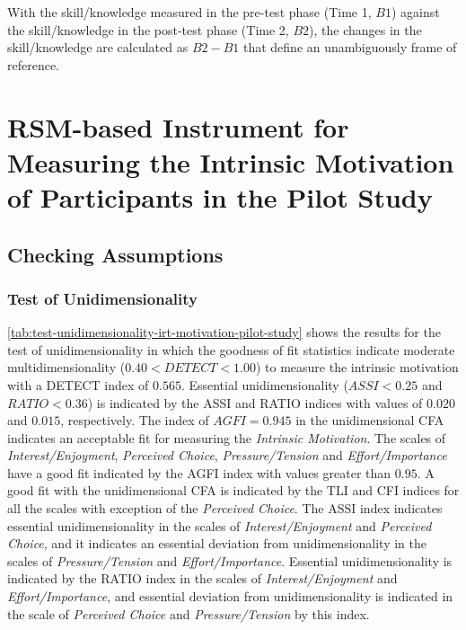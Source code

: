 With the skill/knowledge measured in the pre-test phase (Time 1, $B1$) against the skill/knowledge in the post-test phase (Time 2, $B2$), the changes in the skill/knowledge are calculated as $B2-B1$ that define an unambiguously frame of reference.


\section{RSM-based Instrument for Measuring the Intrinsic Motivation of Participants in the Pilot Study}
\label{sec:irt-motivation-pilot-study}

\subsection{Checking Assumptions}

\subsubsection*{Test of Unidimensionality}

\autoref{tab:test-unidimensionality-irt-motivation-pilot-study} shows the results for the test of unidimensionality in which the goodness of fit statistics indicate moderate multidimensionality ($0.40 < DETECT < 1.00$) to measure the intrinsic motivation with a DETECT index of $0.565$. Essential unidimensionality ($ASSI < 0.25$ and $RATIO < 0.36$) is indicated by the ASSI and RATIO indices with values of $0.020$ and $0.015$, respectively. The index of $AGFI = 0.945$ in the unidimensional CFA indicates an acceptable fit for measuring the \emph{Intrinsic Motivation}. The scales of \emph{Interest/Enjoyment}, \emph{Perceived Choice}, \emph{Pressure/Tension} and \emph{Effort/Importance} have a good fit indicated by the AGFI index with values greater than $0.95$. A good fit with the unidimensional CFA is indicated by the TLI and CFI indices for all the scales with exception of the \emph{Perceived Choice}. The ASSI index indicates essential unidimensionality in the scales of \emph{Interest/Enjoyment} and \emph{Perceived Choice}, and it indicates an essential deviation from unidimensionality in the scales of \emph{Pressure/Tension} and \emph{Effort/Importance}. Essential unidimensionality is indicated by the RATIO index in the scales of \emph{Interest/Enjoyment} and \emph{Effort/Importance}, and essential deviation from unidimensionality is indicated in the scale of \emph{Perceived Choice} and \emph{Pressure/Tension} by this index.

